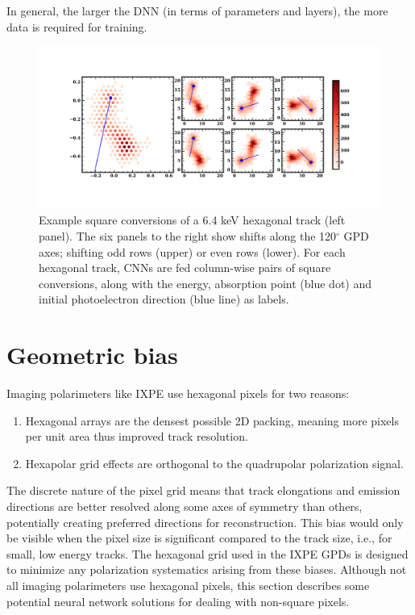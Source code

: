 In general, the larger the DNN (in terms of parameters and layers), the more data is required for training.

\begin{figure}
\centering
\includegraphics[width=1.05\textwidth]{figures/fig2.pdf}
\caption{Example square conversions of a 6.4 keV hexagonal track (left panel). The six panels to the right show shifts along the 120$^\circ$ GPD axes; shifting odd rows (upper) or even rows (lower). For each hexagonal track, CNNs are fed column-wise pairs of square conversions, along with the energy, absorption point (blue dot) and initial photoelectron direction (blue line) as labels.}
\label{fig:square}
\end{figure}

\section{Geometric bias}
\label{sec:geom}
Imaging polarimeters like IXPE use hexagonal pixels for two reasons: 
\begin{enumerate}
    \item Hexagonal arrays are the densest possible 2D packing, meaning more pixels per unit area thus improved track resolution.
    \item Hexapolar grid effects are orthogonal to the quadrupolar polarization signal. 
\end{enumerate}
The discrete nature of the pixel grid means that track elongations and emission directions are better resolved along some axes of symmetry than others, potentially creating preferred directions for reconstruction. This bias would only be visible when the pixel size is significant compared to the track size, i.e., for small, low energy tracks.
The hexagonal grid used in the IXPE GPDs is designed to minimize any polarization systematics arising from these biases.
Although not all imaging polarimeters use hexagonal pixels, this section describes some potential neural network solutions for dealing with non-square pixels.

